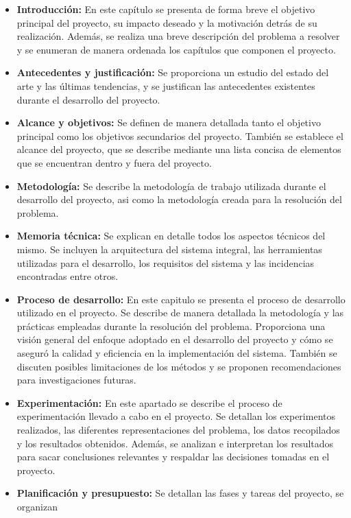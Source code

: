 \begin{itemize}
    \item \textbf{Introducción:} En este capítulo se presenta de forma breve el objetivo 
    principal del proyecto, su impacto deseado y la motivación detrás de su realización. 
    Además, se realiza una  breve descripción del problema a resolver y se enumeran de manera 
    ordenada los capítulos que componen el proyecto.
    \item \textbf{Antecedentes y justificación:} Se proporciona un estudio del estado del 
    arte y las últimas tendencias, y se justifican las antecedentes existentes durante el 
    desarrollo del proyecto.
    \item \textbf{Alcance y objetivos:} Se definen de manera detallada tanto el objetivo 
    principal como los objetivos secundarios del proyecto. También se establece el alcance 
    del proyecto, que se describe mediante una lista concisa de elementos que se encuentran 
    dentro y fuera del proyecto.
    \item \textbf{Metodología:} Se describe la metodología de trabajo utilizada durante el
    desarrollo del proyecto, asi como la metodología creada para la resolución del problema.
    \item \textbf{Memoria técnica:} Se explican en detalle todos los aspectos técnicos del mismo. 
    Se incluyen la arquitectura del sistema integral, las herramientas utilizadas para el desarrollo, 
    los requisitos del sistema y las incidencias encontradas entre otros.
    \item \textbf{Proceso de desarrollo:} En este capitulo se presenta el proceso de desarrollo 
    utilizado en el proyecto. Se describe de manera detallada la metodología y las prácticas 
    empleadas durante la resolución del problema. Proporciona una visión general del enfoque 
    adoptado en el desarrollo del proyecto y cómo se aseguró la calidad y eficiencia en la 
    implementación del sistema. También se discuten posibles limitaciones de los métodos 
    y se proponen recomendaciones para investigaciones futuras.
    \item \textbf{Experimentación:} En este apartado se describe el proceso de experimentación 
    llevado a cabo en el proyecto. Se detallan los experimentos realizados, las diferentes
    representaciones del problema, los datos recopilados y los resultados obtenidos. Además, 
    se analizan e interpretan los resultados para sacar conclusiones relevantes y respaldar 
    las decisiones tomadas en el proyecto.  
    \item \textbf{Planificación y presupuesto:} Se detallan las fases y tareas del proyecto, se organizan 

\end{itemize}
